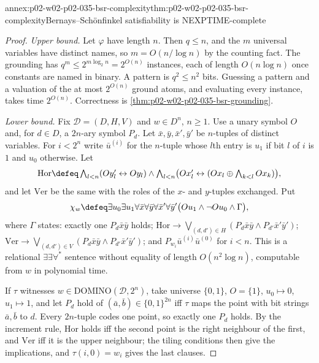 \begin{annexitem}{annex:p02-w02-p02-035-bsr-complexity}{thm:p02-w02-p02-035-bsr-complexity}{Bernays--Sch\"onfinkel satisfiability is NEXPTIME-complete}
\begin{proof}
\emph{Upper bound.}  Let \(\varphi\) have length \(n\).  Then \(q\leq n\), and
the \(m\) universal variables have distinct names, so \(m=O(n/\log n)\) by the
counting fact.  The grounding has \(q^m\leq2^{m\log_2 n}=2^{O(n)}\) instances,
each of length \(O(n\log n)\) once constants are named in binary.  A pattern
is \(q^2\leq n^2\) bits.  Guessing a pattern and a valuation of the at most
\(2^{O(n)}\) ground atoms, and evaluating every instance, takes time
\(2^{O(n)}\).  Correctness is \cref{thm:p02-w02-p02-035-bsr-grounding}.

\emph{Lower bound.}  Fix \(\mathcal D=(D,H,V)\) and \(w\in D^n\), \(n\geq1\).
Use a unary symbol \(O\) and, for \(d\in D\), a \(2n\)-ary symbol \(P_d\).
Let \(\bar x,\bar y,\bar x',\bar y'\) be \(n\)-tuples of distinct variables.
For \(i<2^n\) write \(\bar u^{(i)}\) for the \(n\)-tuple whose \(l\)th entry is
\(u_1\) if bit \(l\) of \(i\) is \(1\) and \(u_0\) otherwise.  Let
\[
 \mathrm{Hor}\defeq\textstyle\bigwedge_{l<n}(Oy'_l\leftrightarrow Oy_l)\land
  \bigwedge_{l<n}\bigl(Ox'_l\leftrightarrow
   (Ox_l\oplus\bigwedge_{k<l}Ox_k)\bigr),
\]
and let \(\mathrm{Ver}\) be the same with the roles of the \(x\)- and
\(y\)-tuples exchanged.  Put
\[
 \chi_w\defeq\exists u_0\exists u_1\forall\bar x\forall\bar y\forall\bar x'
 \forall\bar y'\bigl(Ou_1\land\neg Ou_0\land\Gamma\bigr),
\]
where \(\Gamma\) states: exactly one \(P_d\bar x\bar y\) holds;
\(\mathrm{Hor}\to\bigvee_{(d,d')\in H}(P_d\bar x\bar y\land P_{d'}\bar x'\bar
y')\); \(\mathrm{Ver}\to\bigvee_{(d,d')\in V}(P_d\bar x\bar y\land
P_{d'}\bar x'\bar y')\); and \(P_{w_i}\bar u^{(i)}\bar u^{(0)}\) for \(i<n\).
This is a relational \(\exists\exists\forall^{*}\) sentence without equality
of length \(O(n^2\log n)\), computable from \(w\) in polynomial time.

If \(\tau\) witnesses \(w\in\mathrm{DOMINO}(\mathcal D,2^n)\), take universe
\(\{0,1\}\), \(O=\{1\}\), \(u_0\mapsto0\), \(u_1\mapsto1\), and let
\(P_d\) hold of \((\bar a,\bar b)\in\{0,1\}^{2n}\) iff \(\tau\) maps the point
with bit strings \(\bar a,\bar b\) to \(d\).  Every \(2n\)-tuple codes one
point, so exactly one \(P_d\) holds.  By the increment rule,
\(\mathrm{Hor}\) holds iff the second point is the right neighbour of the
first, and \(\mathrm{Ver}\) iff it is the upper neighbour; the tiling
conditions then give the implications, and \(\tau(i,0)=w_i\) gives the last
clauses.


\end{proof}
\end{annexitem}
